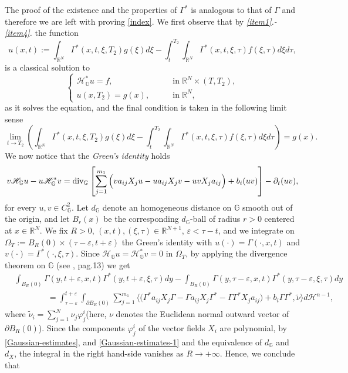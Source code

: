 \documentclass[11pt,a4paper]{article}
\numberwithin{equation}{section}
\def \rn {{\mathbb {R}}^{N}}
\def \rnn {{\mathbb {R}}^{N+1}}
\def \GG {{\mathbb{G}}}
\def \div {{\text{\rm div}}}
\def \p {\partial}
\def \H {\mathscr{H}_\GG}
\def \HH{\mathscr{H}_\GG^*}
\def \G {{\Gamma}}
\def \e {{\varepsilon}}
\def \t {{\tau}}
\def \n {{\nu}}
\def \x {{\xi}}
\def \phi {{\varphi}}
\def \O {{\Omega}}
\begin{document}
\begin{pf-fundamental}
	The proof of the existence and the properties of $\G^*$ is analogous to that of $\G$ and therefore we are left with proving \eqref{index}. We first observe that by \emph{\ref{item1}.-\ref{item4}.} the function
	\begin{equation}
		u(x,t):=\int_{\rn}\G^*(x,t,\xi,T_2)g(\xi)d\xi - \int_{t}^{T_2}\int_{\rn}\G^*(x,t,\xi,\tau)f(\xi,\tau)d\xi d\tau,
	\end{equation}
	is a classical solution to
	\begin{equation}
		\begin{cases}
			\HH u = f,\qquad &\mathrm{in}\;\rn\times(T,T_2),\\      
			u(x,T_2)=g(x),\qquad &\mathrm{in}\;\rn,
		\end{cases}
	\end{equation}
	as it solves the equation, and the final condition is taken in the following limit sense
	\begin{equation}\label{datofinale}
		\lim\limits_{t\rightarrow T_2}\left(\int_{\rn} \G^*(x,t,\xi,T_2)g(\xi)d\xi - \int_{t}^{T_2}\int_{\rn}\G^*(x,t,\xi,\tau)f(\xi,\tau)d\xi d\tau\right)=g(x).
	\end{equation}
	We now notice that the \emph{Green's identity} holds 
	\begin{equation}\label{green}
		v\H u-u\HH v=\div_\GG\left[\sum_{j=1}^{m_1}\Big(va_{ij}X_ju-ua_{ij}X_jv-uvX_ja_{ij}\Big)+b_i(uv)\right]-\p_t(uv),
	\end{equation}
	for every $u,v \in C_\GG^2$. Let $d_{\GG}$ denote an homogeneous distance on $\GG$ smooth out of the origin, and let $B_r(x)$ be the corresponding $d_\GG$-ball of radius $r>0$ centered at $x\in\rn$. We fix $R>0$, $(x,t),(\x,\t)\in \rnn$, $\e<\t-t$, and we integrate on $\O_T:=B_R(0)\times (\t-\e,t+\e)$  the Green's identity with $u(\cdot)=\G(\cdot,x,t)$ and $v(\cdot)=\G^*(\cdot,\xi,\t)$. Since $\H u =\HH v=0$ in $\O_T$, by applying the divergence theorem on $\GG$ (see \cite{pallara2022mean}, pag.13) we get
	\begin{equation}
		\begin{aligned}
			&\int_{B_R(0)}\G(y,t+\e,x,t)\G^*(y,t+\e,\x,\t)dy-\int_{B_R(0 )}\G(y,\t-\e,x,t)\G^*(y,\t-\e,\x,\t)dy\\	
			&\qquad\qquad=\int_{\t-\e}^{t+\e}\int_{\p B_R(0)}\sum_{j=1}^{m_1}\Big\langle\big(\G^*a_{ij}X_j\G-\G a_{ij}X_j\G^*-\G\G^*X_ja_{ij}\big)+b_i\G\G^*,\tilde{\n} \Big\rangle d \mathcal{H}^{n-1},
		\end{aligned}
	\end{equation}
	where $\tilde{\n}_i=\sum_{j=1}^N \n_j\phi_j^i$(here, $\n$ denotes the Euclidean normal outward vector of $\p B_R(0)$). Since the components $\phi_j^i$ of the vector fields $X_i$ are polynomial, by \eqref{Gaussian-estimates}, and \eqref{Gaussian-estimates-1}  and the equivalence of $d_\GG$ and $d_X$, the integral in the right hand-side vanishes as $R\rightarrow +\infty$. Hence, we conclude that

\end{pf-fundamental}
\end{document}
